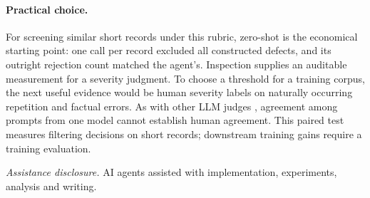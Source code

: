 \documentclass{article}
\begin{document}
\newpage
\paragraph{Practical choice.}
For screening similar short records under this rubric, zero-shot is the economical starting point: one call per record excluded all constructed defects, and its outright rejection count matched the agent's. Inspection supplies an auditable measurement for a severity judgment. To choose a threshold for a training corpus, the next useful evidence would be human severity labels on naturally occurring repetition and factual errors. As with other LLM judges \citep{zheng2023}, agreement among prompts from one model cannot establish human agreement. This paired test measures filtering decisions on short records; downstream training gains require a training evaluation.

\noindent\textit{Assistance disclosure.} AI agents assisted with implementation, experiments, analysis and writing.

{\footnotesize\raggedright\setlength{\bibsep}{1pt}}
\end{document}
